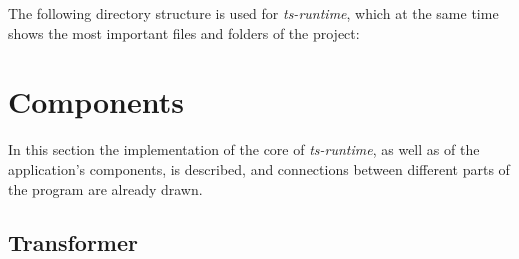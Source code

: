 The following directory structure is used for \emph{ts-runtime}, which at the same time shows the most important files and folders of the project:
\begin{center}
\begin{varwidth}{\textwidth}
\hspace*{-1.2em}\begin{minipage}[t]{1.0\textwidth}
%
\end{minipage}
\end{varwidth}
\end{center}

\section{Components}
\label{sec:components}


In this section the implementation of the core of \emph{ts-runtime}, as well as of the application's components, is described, and connections between different parts of the program are already drawn.

\subsection{Transformer}

